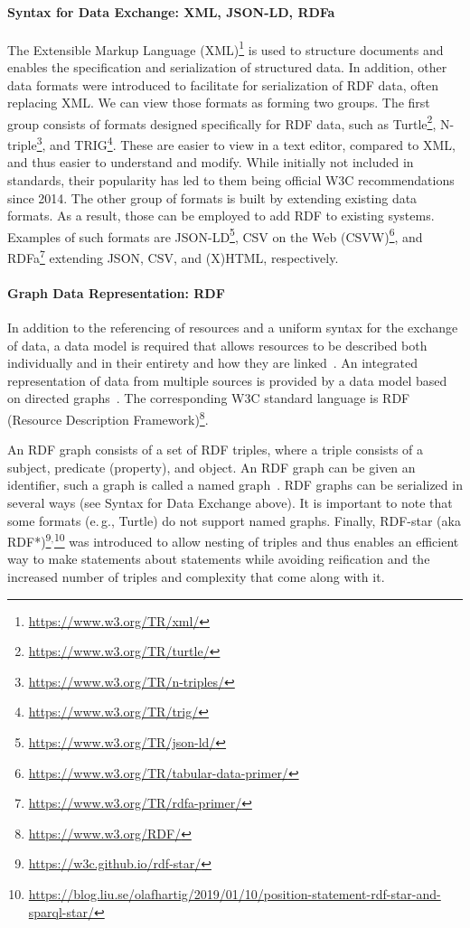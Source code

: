 \documentclass[a4paper,USenglish]{tgdk-v2021}
\newcommand{\myurl}[1]{\footnote{\url{#1}}}
\begin{document}
\paragraph*{Syntax for Data Exchange: XML, JSON-LD, RDFa} 
The Extensible Markup Language (XML)\myurl{https://www.w3.org/TR/xml/} is used to structure documents and enables the specification and serialization of structured data. In addition, other data formats were introduced to facilitate for serialization of RDF data, often replacing XML.
We can view those formats as forming two groups.
The first group consists of formats designed specifically for RDF data, such as Turtle\myurl{https://www.w3.org/TR/turtle/}, N-triple\footnote{\url{https://www.w3.org/TR/n-triples/}}, and TRIG\myurl{https://www.w3.org/TR/trig/}.
These are easier to view in a text editor, compared to XML, and thus easier to understand and modify.
While initially not included in standards, their popularity has led to them being official W3C recommendations since 2014.
The other group of formats is built by extending existing data formats.
As a result, those can be employed to add RDF to existing systems.
Examples of such formats are JSON-LD\myurl{https://www.w3.org/TR/json-ld/}, CSV on the Web (CSVW)\myurl{https://www.w3.org/TR/tabular-data-primer/}, and RDFa\myurl{https://www.w3.org/TR/rdfa-primer/} extending JSON, CSV, and (X)HTML, respectively.

\paragraph*{Graph Data Representation: RDF}

In addition to the referencing of resources and a uniform syntax for the exchange of data, a data model is required that allows resources to be described both individually and in their entirety and how they are linked~\cite{DBLP:books/crc/linked2014,DBLP:reference/bdt/HartigHS19}.
An integrated representation of data from multiple sources is provided by a data model based on directed graphs~\cite{key:oem}.
The corresponding W3C standard language is RDF (Resource Description Framework)\footnote{\url{https://www.w3.org/RDF/}}.

An RDF graph consists of a set of RDF triples, where a triple consists of a subject, predicate (property), and object.
An RDF graph can be given an identifier, such a graph is called a named graph~\cite{DBLP:conf/semweb/CarrollBHS04}.
RDF graphs can be serialized in several ways (see Syntax for Data Exchange above).
It is important to note that some formats (e.\,g., Turtle) do not support named graphs. 
Finally, RDF-star (aka RDF*)\footnote{\url{https://w3c.github.io/rdf-star/}}$^,$\footnote{\url{https://blog.liu.se/olafhartig/2019/01/10/position-statement-rdf-star-and-sparql-star/}} was introduced to allow nesting of triples and thus enables an efficient way to make statements about statements while avoiding reification and the increased number of triples and complexity that come along with it.
\end{document}
